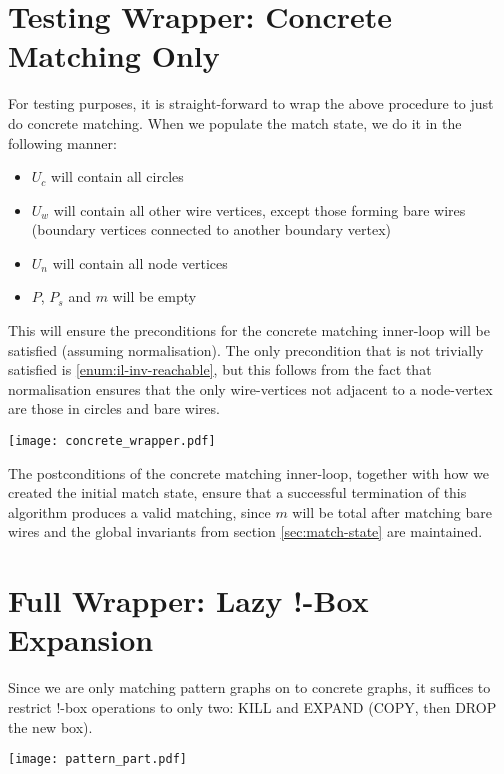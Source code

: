 \documentclass{article}
\begin{document}
\section{Testing Wrapper: Concrete Matching Only}
\label{sec:test-wrapper}

For testing purposes, it is straight-forward to wrap the above procedure to just do concrete matching.  When we populate the match state, we do it in the following manner:
\begin{itemize}
\item $U_c$ will contain all circles
\item $U_w$ will contain all other wire vertices, except those forming bare wires (boundary vertices connected to another boundary vertex)
\item $U_n$ will contain all node vertices
\item $P$, $P_s$ and $m$ will be empty
\end{itemize}

This will ensure the preconditions for the concrete matching inner-loop will be satisfied (assuming normalisation).  The only precondition that is not trivially satisfied is \ref{enum:il-inv-reachable}, but this follows from the fact that normalisation ensures that the only wire-vertices not adjacent to a node-vertex are those in circles and bare wires.

\begin{center}
  \texttt{[image: concrete\_wrapper.pdf]}
\end{center}

The postconditions of the concrete matching inner-loop, together with how we created the initial match state, ensure that a successful termination of this algorithm produces a valid matching, since $m$ will be total after matching bare wires and the global invariants from section \ref{sec:match-state} are maintained.

\section{Full Wrapper: Lazy !-Box Expansion}
\label{sec:full-wrapper}

Since we are only matching pattern graphs on to concrete graphs, it suffices to restrict $!$-box operations to only two: KILL and EXPAND (COPY, then DROP the new box).

\begin{center}
  \texttt{[image: pattern\_part.pdf]}
\end{center}
\end{document}
